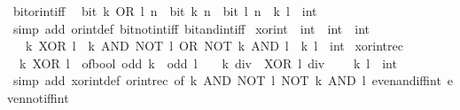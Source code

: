 \begin{isabellebody}
\endisatagproof
{\isafoldproof}%
%
\isadelimproof
\isanewline
%
\endisadelimproof
\isanewline
{}\isamarkupfalse%
\ bit{\isacharunderscore}{\kern0pt}or{\isacharunderscore}{\kern0pt}int{\isacharunderscore}{\kern0pt}iff{\isacharcolon}{\kern0pt}\isanewline
\ \ {\isacartoucheopen}bit\ {\isacharparenleft}{\kern0pt}k\ OR\ l{\isacharparenright}{\kern0pt}\ n\ {\isasymlongleftrightarrow}\ bit\ k\ n\ {\isasymor}\ bit\ l\ n{\isacartoucheclose}\ \ k\ l\ {\isacharcolon}{\kern0pt}{\isacharcolon}{\kern0pt}\ int\isanewline
%
\isadelimproof
\ \ %
\endisadelimproof
%
\isatagproof
{}\isamarkupfalse%
\ {\isacharparenleft}{\kern0pt}simp\ add{\isacharcolon}{\kern0pt}\ or{\isacharunderscore}{\kern0pt}int{\isacharunderscore}{\kern0pt}def\ bit{\isacharunderscore}{\kern0pt}not{\isacharunderscore}{\kern0pt}int{\isacharunderscore}{\kern0pt}iff\ bit{\isacharunderscore}{\kern0pt}and{\isacharunderscore}{\kern0pt}int{\isacharunderscore}{\kern0pt}iff{\isacharparenright}{\kern0pt}%
\endisatagproof
{\isafoldproof}%
%
\isadelimproof
\isanewline
%
\endisadelimproof
\isanewline
{}\isamarkupfalse%
\ xor{\isacharunderscore}{\kern0pt}int\ {\isacharcolon}{\kern0pt}{\isacharcolon}{\kern0pt}\ {\isacartoucheopen}int\ {\isasymRightarrow}\ int\ {\isasymRightarrow}\ int{\isacartoucheclose}\isanewline
\ \ \ {\isacartoucheopen}k\ XOR\ l\ {\isacharequal}{\kern0pt}\ k\ AND\ NOT\ l\ OR\ NOT\ k\ AND\ l{\isacartoucheclose}\ \ k\ l\ {\isacharcolon}{\kern0pt}{\isacharcolon}{\kern0pt}\ int\isanewline
\isanewline
{}\isamarkupfalse%
\ xor{\isacharunderscore}{\kern0pt}int{\isacharunderscore}{\kern0pt}rec{\isacharcolon}{\kern0pt}\isanewline
\ \ {\isacartoucheopen}k\ XOR\ l\ {\isacharequal}{\kern0pt}\ of{\isacharunderscore}{\kern0pt}bool\ {\isacharparenleft}{\kern0pt}odd\ k\ {\isasymnoteq}\ odd\ l{\isacharparenright}{\kern0pt}\ {\isacharplus}{\kern0pt}\ {}\ {\isacharasterisk}{\kern0pt}\ {\isacharparenleft}{\kern0pt}{\isacharparenleft}{\kern0pt}k\ div\ {}{\isacharparenright}{\kern0pt}\ XOR\ {\isacharparenleft}{\kern0pt}l\ div\ {}{\isacharparenright}{\kern0pt}{\isacharparenright}{\kern0pt}{\isacartoucheclose}\isanewline
\ \ \ k\ l\ {\isacharcolon}{\kern0pt}{\isacharcolon}{\kern0pt}\ int\isanewline
%
\isadelimproof
\ \ %
\endisadelimproof
%
\isatagproof
{}\isamarkupfalse%
\ {\isacharparenleft}{\kern0pt}simp\ add{\isacharcolon}{\kern0pt}\ xor{\isacharunderscore}{\kern0pt}int{\isacharunderscore}{\kern0pt}def\ or{\isacharunderscore}{\kern0pt}int{\isacharunderscore}{\kern0pt}rec\ {\isacharbrackleft}{\kern0pt}of\ {\isacartoucheopen}k\ AND\ NOT\ l{\isacartoucheclose}\ {\isacartoucheopen}NOT\ k\ AND\ l{\isacartoucheclose}{\isacharbrackright}{\kern0pt}\ even{\isacharunderscore}{\kern0pt}and{\isacharunderscore}{\kern0pt}iff{\isacharunderscore}{\kern0pt}int\ even{\isacharunderscore}{\kern0pt}not{\isacharunderscore}{\kern0pt}iff{\isacharunderscore}{\kern0pt}int{\isacharparenright}{\kern0pt}\isanewline

\end{isabellebody}
